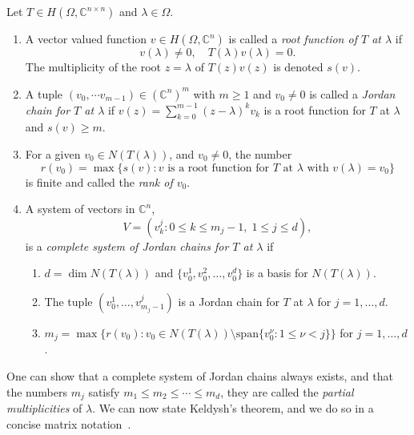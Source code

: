 \documentclass[onefignum,onetabnum]{siamart190516}
\begin{document}
\begin{definition}
	Let \( T \in H(\Omega, \mathbb{C}^{n\times n}) \) and \( \lambda \in \Omega \). 
	\begin{enumerate}
		\item	
			A vector valued function \( v \in H(\Omega, \mathbb{C}^n) \) is called a \textit{root function of \( T \) at \( \lambda \)} if
			\begin{equation*}
				v(\lambda) \neq 0, 
				\quad
				T(\lambda)v(\lambda) = 0.
			\end{equation*}
			The multiplicity of the root \( z = \lambda \) of \( T(z)v(z) \) is denoted \( s(v) \).
		\item
			A tuple \( (v_0, \cdots v_{m-1}) \in {(\mathbb{C}^n)}^m \) with \( m \ge 1 \) and \( v_0 \neq 0 \) is called a \textit{Jordan chain for \( T \) at \( \lambda \)} if \( v(z) = \sum_{k=0}^{m-1} {(z-\lambda)}^k v_k \) is a root function for \( T \) at \( \lambda \) and \( s(v) \ge m \).
		\item
			For a given \( v_0 \in N(T(\lambda)) \), and \( v_0 \neq 0 \), the number
			\begin{equation*}
				r(v_0) = \max \{ s(v) : v \text{ is a root function for } T \text{ at } \lambda \text{ with } v(\lambda) = v_0 \}
			\end{equation*}
			is finite and called the \textit{rank of \( v_0 \)}.
		\item
			A system of vectors in \( \mathbb{C}^n \),
			\begin{equation*}
				V = (v_k^j : 0 \le k \le m_j -1, \; 1 \le j \le d),
			\end{equation*}
			is a \textit{complete system of Jordan chains for \( T \) at \( \lambda \)} if
			\begin{enumerate}
				\item
					\( d = \dim N(T(\lambda)) \) and \( \{v_0^1, v_0^2, \ldots, v_0^d \} \) is a basis for \( N(T(\lambda)) \).
				\item
					The tuple \( (v_0^1, \ldots, v_{m_j-1}^j) \) is a Jordan chain for \( T \) at \( \lambda \) for \( j=1,\ldots,d \).
				\item
					\( m_j = \max \{r(v_0) : v_0 \in N(T(\lambda)) \setminus \text{span} \{v_0^\nu : 1 \le \nu < j\} \} \) for \( j = 1,\ldots,d \).
			\end{enumerate}
	\end{enumerate}
\end{definition}
	One can show that a complete system of Jordan chains always exists, and that the numbers \( m_j \) satisfy \( m_1 \le m_2 \le \cdots \le m_d \), they are called the \textit{partial multiplicities} of \( \lambda \).
	We can now state Keldysh's theorem, and we do so in a concise matrix notation~\cite{guttel2017}.
\end{document}

